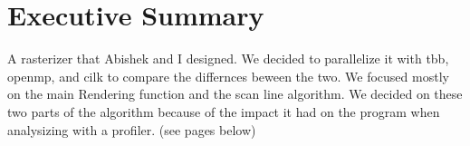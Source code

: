 \chapter*{Executive Summary}
A rasterizer that Abishek and I designed. We decided to parallelize it with tbb, openmp, and cilk to compare the differnces beween the two. We focused mostly on the main Rendering function and the scan line algorithm.
We decided on these two parts of the algorithm because of the impact it had on the program when analysizing with a profiler. (see pages below)  
